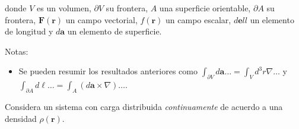 \documentclass{exam}
\begin{document}
\begin{questions}
  donde $V$ es un volumen, $\partial V$ su frontera, $A$ una
  superficie orientable, $\partial A$ su frontera, $\bm F(\bm r)$ un campo
  vectorial, $f(\bm r)$ un campo escalar, $d\bm ell$ un elemento de
  longitud y $d\bm a$ un elemento de superficie.

  Notas:
  \begin{itemize}
  \item Se pueden resumir los resultados anteriores como
    $\int_{\partial V} d\bm a\ldots=\int_Vd^3r\nabla\ldots$ y
    $\int_{\partial A} d\bm \ell\ldots=\int_A(d\bm
    a\times\nabla)\ldots$.
  \end{itemize}

  \question Considera un sistema con carga distribuida {\em
    continuamente} de acuerdo a una densidad $\rho(\bm r)$.
\end{questions}
\end{document}
